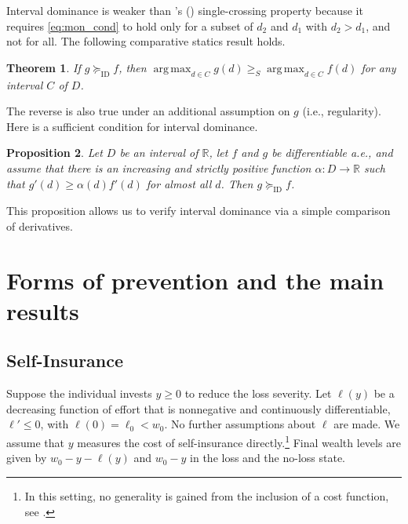 \documentclass[11pt]{article}
\newtheorem{theorem}{Theorem}[section]
\newtheorem{proposition}[theorem]{Proposition}
\DeclareMathOperator*{\argmax}{arg\,max}
\begin{document}
Interval dominance is weaker than \citeauthor{milgrom1994monotone}'s (\citeyear{milgrom1994monotone}) single-crossing property because it requires \eqref{eq:mon_cond} to hold only for a subset of $d_2$ and $d_1$ with $d_2 > d_1$, and not for all. The following comparative statics result holds.

\begin{theorem}\label{theo:ID}
	If $g \succeq_{\text{ID}} f$, then $\argmax_{d \in C} g(d) \geq_S \argmax_{d \in C} f(d)$ for any interval $C$ of $D$.
\end{theorem}

The reverse is also true under an additional assumption on $g$ (i.e., regularity). Here is a sufficient condition for interval dominance.

\begin{proposition}\label{prop:ID}
	Let $D$ be an interval of $\mathbb{R}$, let $f$ and $g$ be differentiable a.e., and assume that there is an increasing and strictly positive function $\alpha: D \rightarrow \mathbb{R}$ such that $g'(d) \geq \alpha(d) f'(d)$ for almost all $d$. Then $g \succeq_{\text{ID}} f$.
\end{proposition}

This proposition allows us to verify interval dominance via a simple comparison of derivatives.


\section{Forms of prevention and the main results}
\subsection{Self-Insurance}

Suppose the individual invests $y \geq 0$ to reduce the loss severity. Let $\ell(y)$ be a decreasing function of effort that is nonnegative and continuously differentiable, $\ell' \leq 0$, with $\ell(0) = \ell_0 < w_0$. No further assumptions about $\ell$ are made. We assume that $y$ measures the cost of self-insurance directly.\footnote{In this setting, no generality is gained from the inclusion of a cost function, see \cite{peter2024selfprotection}.} Final wealth levels are given by $w_0-y-\ell(y)$ and $w_0-y$ in the loss and the no-loss state.
\end{document}
